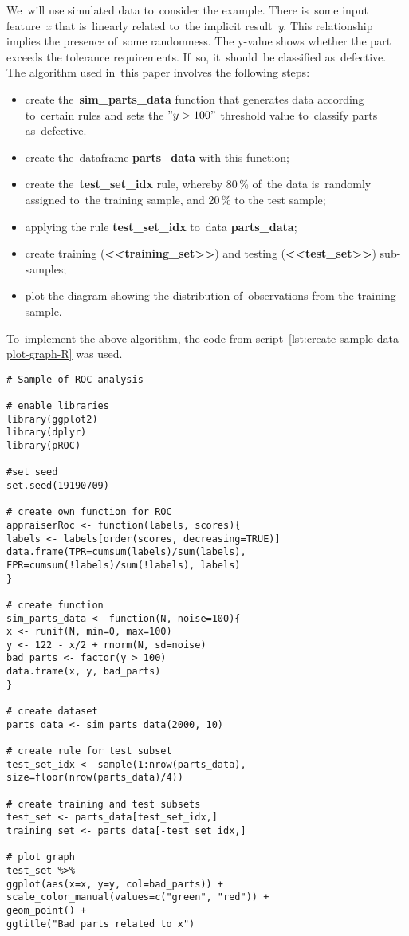 \documentclass[]{scrreprt}
\begin{document}
We~will use simulated data to~consider the example. There is~some input feature~\emph{x} that is~linearly related to~the implicit result~\emph{y}. This relationship implies the presence of~some randomness. The y-value shows whether the part exceeds the tolerance requirements. If~so, it~should~be classified as~defective. The algorithm used in~this paper involves the following steps:
\begin{itemize}
	\item create the~\textbf{sim\_parts\_data} function that generates data according to~certain rules and sets the $"y>100"$ threshold value to~classify parts as~defective.
	\item create the~dataframe \textbf{parts\_data} with this function;
	\item create the~\textbf{test\_set\_idx} rule, whereby 80\,\% of~the data is~randomly assigned to~the training sample, and 20\,\% to the test sample;
	\item applying the rule \textbf{test\_set\_idx} to~data \textbf{parts\_data};
	\item create training (\textbf{<<training\_set>>}) and testing (\textbf{<<test\_set>>}) sub-samples;
	\item plot the diagram showing the distribution of~observations from the training sample.
\end{itemize}
To~implement the above algorithm, the code from script~\ref{lst:create-sample-data-plot-graph-R} was used.
%
\begin{lstlisting}[float=htp, caption = Creation and primary visualization of~data on~quality and defective parts, firstnumber=1, label= lst:create-sample-data-plot-graph-R]
# Sample of ROC-analysis

# enable libraries
library(ggplot2)
library(dplyr)
library(pROC)

#set seed
set.seed(19190709)

# create own function for ROC
appraiserRoc <- function(labels, scores){
labels <- labels[order(scores, decreasing=TRUE)]
data.frame(TPR=cumsum(labels)/sum(labels),
FPR=cumsum(!labels)/sum(!labels), labels)
}

# create function 
sim_parts_data <- function(N, noise=100){
x <- runif(N, min=0, max=100)
y <- 122 - x/2 + rnorm(N, sd=noise)
bad_parts <- factor(y > 100)
data.frame(x, y, bad_parts)
}

# create dataset
parts_data <- sim_parts_data(2000, 10)

# create rule for test subset
test_set_idx <- sample(1:nrow(parts_data), size=floor(nrow(parts_data)/4))

# create training and test subsets
test_set <- parts_data[test_set_idx,]
training_set <- parts_data[-test_set_idx,]

# plot graph
test_set %>% 
ggplot(aes(x=x, y=y, col=bad_parts)) + 
scale_color_manual(values=c("green", "red")) + 
geom_point() + 
ggtitle("Bad parts related to x")

\end{lstlisting}
%
\end{document}
